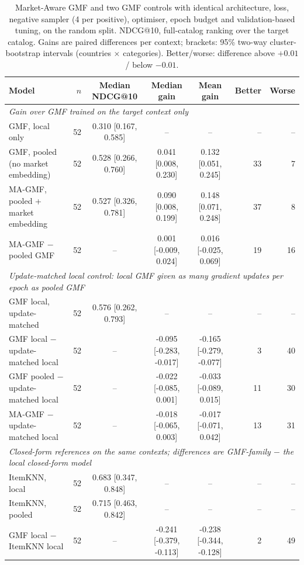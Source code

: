 \begin{table}[t]
\centering\small
\caption{Market-Aware GMF \citep{bhargav2023market} and two GMF controls with identical architecture, loss, negative sampler (4 per positive), optimiser, epoch budget and validation-based tuning, on the random split. NDCG@10, full-catalog ranking over the target catalog. Gains are paired differences per context; brackets: 95\% two-way cluster-bootstrap intervals (countries $\times$ categories). Better/worse: difference above $+0.01$ / below $-0.01$.}
\label{tab:mkt}
\begin{tabular}{lrcccrr}
\toprule
Model & $n$ & Median NDCG@10 & Median gain & Mean gain & Better & Worse \\
\midrule
\multicolumn{7}{l}{\emph{Gain over GMF trained on the target context only}}\\
GMF, local only & 52 & 0.310 [0.167, 0.585] & -- & -- & -- & -- \\
GMF, pooled (no market embedding) & 52 & 0.528 [0.266, 0.760] & 0.041 [0.008, 0.230] & 0.132 [0.051, 0.245] & 33 & 7 \\
MA-GMF, pooled + market embedding & 52 & 0.527 [0.326, 0.781] & 0.090 [0.008, 0.199] & 0.148 [0.071, 0.248] & 37 & 8 \\
\midrule
MA-GMF $-$ pooled GMF & 52 & -- & 0.001 [-0.009, 0.024] & 0.016 [-0.025, 0.069] & 19 & 16 \\
\midrule
\multicolumn{7}{l}{\emph{Update-matched local control: local GMF given as many gradient updates per epoch as pooled GMF}}\\
GMF local, update-matched & 52 & 0.576 [0.262, 0.793] & -- & -- & -- & -- \\
GMF local $-$ update-matched local & 52 & -- & -0.095 [-0.283, -0.017] & -0.165 [-0.279, -0.077] & 3 & 40 \\
GMF pooled $-$ update-matched local & 52 & -- & -0.022 [-0.085, 0.001] & -0.033 [-0.089, 0.015] & 11 & 30 \\
MA-GMF $-$ update-matched local & 52 & -- & -0.018 [-0.065, 0.003] & -0.017 [-0.071, 0.042] & 13 & 31 \\
\midrule
\multicolumn{7}{l}{\emph{Closed-form references on the same contexts; differences are GMF-family $-$ the local closed-form model}}\\
ItemKNN, local & 52 & 0.683 [0.347, 0.848] & -- & -- & -- & -- \\
ItemKNN, pooled & 52 & 0.715 [0.463, 0.842] & -- & -- & -- & -- \\
GMF local $-$ ItemKNN local & 52 & -- & -0.241 [-0.379, -0.113] & -0.238 [-0.344, -0.128] & 2 & 49 \\

\end{tabular}
\end{table}
